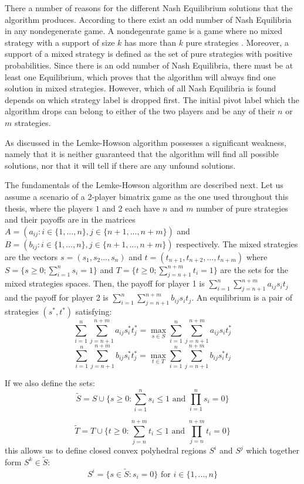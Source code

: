 There a number of reasons for the different Nash Equilibrium solutions that the algorithm produces. According to \citet{lemke1964equilibrium} there exist an odd number of Nash Equilibria in any nondegenerate game. A nondegenrate game is a game where no mixed strategy with a support of size $k$ has more than $k$ pure strategies \citep{nisan2007algorithmic}. Moreover, a support of a mixed strategy is defined as the set of pure strategies with positive probabilities. Since there is an odd number of Nash Equilibria, there must be at least one Equilibrium, which proves that the algorithm will always find one solution in mixed strategies. However, which of all Nash Equilibria is found depends on which strategy label is dropped first. The initial pivot label which the algorithm drops can belong to either of the two players and be any of their $n$ or $m$ strategies.

As discussed in \citet{shapley1974note} the Lemke-Howson algorithm possesses a significant weakness, namely that it is neither guaranteed that the algorithm will find all possible solutions, nor that it will tell if there are any unfound solutions.

The fundamentals of the Lemke-Howson algorithm are described next. Let us assume a scenario of a 2-player bimatrix game as the one used throughout this thesis, where the players $1$ and $2$ each have $n$ and $m$ number of pure strategies and their payoffs are in the matrices $A = (a_{ij}: i \in \{1,...,n\}, j \in \{ n+1,...,n+m\})$ and $B = (b_{ij}: i \in \{1,...,n\}, j \in \{n+1,...,n+m\})$ respectively. The mixed strategies are the vectors $s=(s_1,s_2...,s_n)$ and $t=(t_{n+1},t_{n+2},...,t_{n+m})$ where $S = \{s \geq 0; \sum_{i=1}^{n}s_i = 1\}$ and $T = \{t \geq 0; \sum_{j=n+1}^{n+m}t_i = 1\}$ are the sets for the mixed strategies spaces. Then, the payoff for player 1 is $\sum_{i=1}^{n}\sum_{j=n+1}^{n+m} a_{ij} s_i t_j$ and the payoff for player 2 is $\sum_{i=1}^{n} \sum_{j=n+1}^{n+m} b_{ij} s_i t_j$. An equilibrium is a pair of strategies $(s^*,t^*)$ satisfying:
\[
\sum_{i=1}^{n} \sum_{j=n+1}^{n+m} a_{ij}s_i^*t_j^* = \max_{s \in S} \sum_{i=1}^{n} \sum_{j=n+1}^{n+m} a_{ij}s_i t_j^*
\]
\[
\sum_{i=1}^{n} \sum_{j=n+1}^{n+m} b_{ij}s_i^*t_j^* = \max_{t \in T} \sum_{i=1}^{n} \sum_{j=n+1}^{n+m} b_{ij}s_i^* t_j
\]

If we also define the sets:
\[
\tilde{S} =  S \cup \{ s \geq 0: \sum_{i=1}^{n} s_i \leq 1 \text{ and } \prod_{i=1}^{n} s_i = 0 \}
\]

\[
\tilde{T} = T \cup \{t \geq 0: \sum_{j=n}^{n+m} t_i \leq 1 \text{ and } \prod_{j=n}^{n+m} t_i = 0 \}
\]
this allows us to define closed convex polyhedral regions $S^i$ and $S^j$ which together form $S^k \in \tilde{S}$:
\[
S^i = \{ s \in \tilde{S}: s_i = 0 \} \text{ for } i \in \{1,...,n\}
\]

